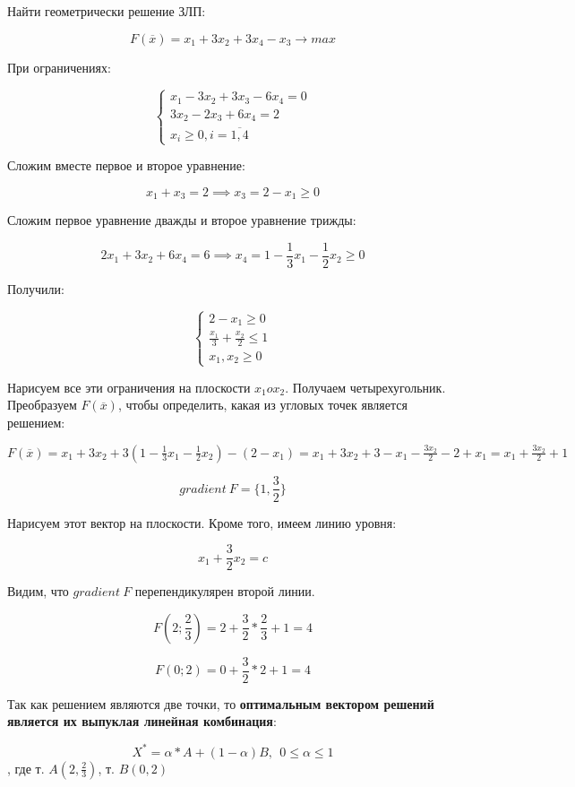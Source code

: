 \documentclass{article}
\begin{document}
Найти геометрически решение ЗЛП:

$$
F(\overline{x}) = x_1 + 3x_2 + 3x_4 - x_3 \to max
$$

При ограничениях:

$$
\begin{cases}
    x_1 - 3x_2 + 3x_3 - 6x_4 = 0 \\
    3x_2 - 2x_3 + 6x_4 = 2 \\
    x_{i} \ge 0, i = \overline{1, 4}
\end{cases}
$$

Сложим вместе первое и второе уравнение:

$$
x_1 + x_3 = 2 \implies x_3 = 2 - x_1 \ge 0
$$

Сложим первое уравнение дважды и второе уравнение трижды:

$$
2x_1 + 3x_2 + 6x_4 = 6 \implies x_4 = 1 - \frac{1}{3} x_1 - \frac{1}{2}x_2 \ge 0
$$

Получили:

$$
\begin{cases}
    2 - x_1 \ge 0 \\
    \frac{x_1}{3} + \frac{x_2}{2} \le 1 \\
    x_1, x_2 \ge 0
\end{cases}
$$

Нарисуем все эти ограничения на плоскости $x_1 o x_2$. Получаем четырехугольник. Преобразуем $F(\overline{x})$, чтобы определить, какая из угловых точек является решением:

$F(\overline{x}) = x_1 + 3x_2 + 3 (1 - \frac{1}{3} x_1 - \frac{1}{2} x_2) - (2 - x_1) = x_1 + 3x_2 + 3 - x_1 - \frac{3x_2}{2} - 2 + x_1 = x_1 + \frac{3x_2}{2} + 1$

$$
gradient \ F = \{ 1, \frac{3}{2} \}
$$

Нарисуем этот вектор на плоскости. Кроме того, имеем линию уровня:

$$x_1 + \frac{3}{2}x_2 = c$$

Видим, что $gradient \ F$ перепендикулярен второй линии.

$$
F(2; \frac{2}{3}) = 2 + \frac{3}{2} * \frac{2}{3} + 1 = 4
$$

$$
F(0; 2) = 0 + \frac{3}{2} * 2 + 1 = 4
$$

Так как решением являются две точки, то \textbf{оптимальным вектором решений является их выпуклая линейная комбинация}:

$$
X^{*} = \alpha * A + (1 - \alpha) B, \ \ 0 \le \alpha \le 1
$$, где т. $A(2, \frac{2}{3})$, т. $B(0, 2)$
\end{document}
